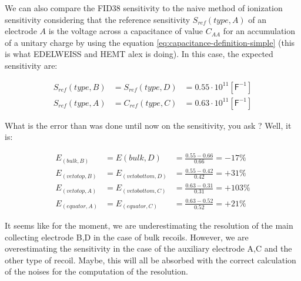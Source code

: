 We can also compare the FID38 sensitivity to the naive method of ionization sensitivity considering that the reference sensitivity $S_{ref}(type, A)$ of an electrode $A$ is the voltage across a capacitance of value $C_{AA}$ for an accumulation of a unitary charge by using the equation \ref{eq:capacitance-definition-simple} (this is what EDELWEISS and HEMT alex is doing). In this case, the expected sensitivity are:

\begin{equation}
\begin{array}{llr}
S_{ref}(type, B) &= S_{ref}(type, D) &= 0.55 \cdot 10^{11} [\textsf{F}^{-1}] \\
S_{ref}(type, A) &= C_{ref}(type, C) &= 0.63 \cdot 10^{11} [\textsf{F}^{-1}]
\end{array}
\end{equation}

What is the error than was done until now on the sensitivity, you ask ? Well, it is:

\begin{equation}
\begin{array}{llr}
E_(bulk, B) &= E(bulk, D) &= \frac{0.55-0.66}{0.66} = -17\% \\
E_(veto top, B) &= E_(veto bottom, D) &= \frac{0.55-0.42}{0.42} = +31\% \\
E_(veto top, A) &= E_(veto bottom, C) &= \frac{0.63-0.31}{0.31} = +103\% \\
E_(equator, A) &= E_(equator, C) &= \frac{0.63-0.52}{0.52} = +21\%
\end{array}
\end{equation}

It seems like for the moment, we are underestimating the resolution of the main collecting electrode B,D in the case of bulk recoils. However, we are overestimating the sensitivity in the case of the auxiliary electrode A,C and the other type of recoil. Maybe, this will all be absorbed with the correct calculation of the noises for the computation of the resolution.

